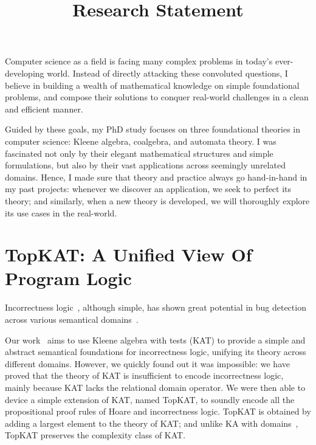 \documentclass[11pt,a4paper,sans]{moderncv} %
\title{Research Statement}
\begin{document}
\makecvtitle %

\setlength\parskip{8px}

Computer science as a field is facing many complex problems in today's ever-developing world. 
Instead of directly attacking these convoluted questions, I believe in building a wealth of mathematical knowledge on simple foundational problems, and compose their solutions to conquer real-world challenges in a clean and efficient manner. 

Guided by these goals, my PhD study focuses on three foundational theories in computer science: Kleene algebra, coalgebra, and automata theory. 
I was fascinated not only by their elegant mathematical structures and simple formulations, but also by their vast applications across seemingly unrelated domains. 
Hence, I made sure that theory and practice always go hand-in-hand in my past projects: whenever we discover an application, we seek to perfect its theory; and similarly, when a new theory is developed, we will thoroughly explore its use cases in the real-world.

\section{TopKAT: A Unified View Of Program Logic}

Incorrectness logic~\cite{ohearn_IncorrectnessLogic_2020}, although simple, has shown great potential in bug detection across various semantical domains~\cite{raad_LocalReasoningPresence_2020,le_FindingRealBugs_2022, zhang_QuantitativeStrongestPost_2022b}.

Our work~\cite{zhang_IncorrectnessLogicKleene_2022} aims to use Kleene algebra with tests (KAT) to provide a simple and abstract semantical foundations for incorrectness logic, unifying its theory across different domains. 
However, we quickly found out it was impossible: we have proved that the theory of KAT is insufficient to encode incorrectness logic, mainly because KAT lacks the relational domain operator.
We were then able to device a simple extension of KAT, named TopKAT, to soundly encode all the propositional proof rules of Hoare and incorrectness logic. 
TopKAT is obtained by adding a largest element to the theory of KAT; and unlike KA with domains~\cite{sedlar_ComplexityKleeneAlgebra_2023}, TopKAT preserves the complexity class of KAT.
\end{document}
